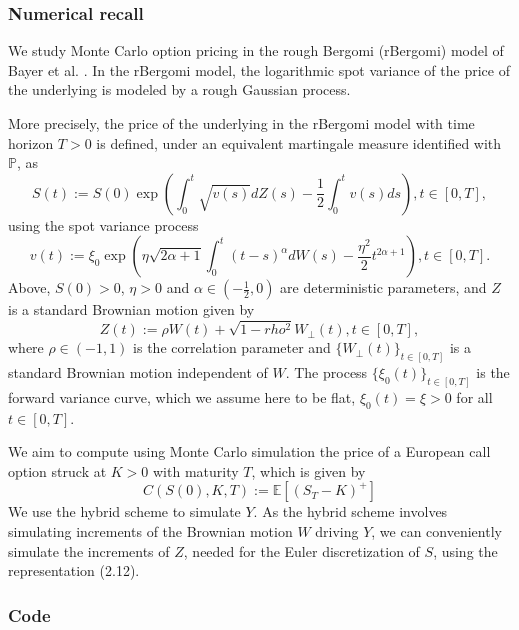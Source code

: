 \documentclass[12pt]{article}
\numberwithin{equation}{section}
\begin{document}
      \subsubsection{Numerical recall}
        
      We study Monte Carlo option pricing in the rough Bergomi (rBergomi) model of Bayer et al. \cite{bayer2015pricing}. In the rBergomi model, the logarithmic spot variance of the price of the underlying is modeled by a rough Gaussian process.

      More precisely, the price of the underlying in the rBergomi model with time horizon $T > 0$ is defined, under an equivalent martingale measure identified with $\mathbb{P}$, as
      \begin{equation}
        S(t) := S(0) \exp\left(\int_0^t\sqrt{v(s)}dZ(s)-\frac{1}{2}\int_0^tv(s)ds\right), t\in[0,T],
      \end{equation}
      using the spot variance process
      \begin{equation}
        v(t) := \xi_0\exp\left(\eta\sqrt{2\alpha+1}\int_0^t(t-s)^\alpha dW(s) - \frac{\eta^2}{2}t^{2\alpha+1}\right), t\in[0,T].
      \end{equation}
      Above, $S(0) > 0$, $\eta > 0$ and $\alpha\in(-\frac{1}{2},0)$ are deterministic parameters, and $Z$ is a standard Brownian motion given by
      \begin{equation}
        Z(t):=\rho W(t)+ \sqrt{1-rho^2} W_\bot(t), t\in[0,T],
      \end{equation}
        where $\rho \in (-1,1)$ is the correlation parameter and $\{W_\bot(t)\}_{t\in[0,T]}$ is a standard Brownian motion independent of $W$. The process $\{\xi_0(t)\}_{t\in[0,T]}$ is the forward variance curve, which we assume here to be flat, $\xi_0(t) = \xi > 0$ for all $t \in [0,T]$.
      
      We aim to compute using Monte Carlo simulation the price of a European call option struck at $K > 0$ with maturity $T$, which is given by
      \begin{equation}
        C(S(0), K, T) := \mathbb{E} [(S_T - K)^+]
      \end{equation}
      We use the hybrid scheme to simulate $Y$. As the hybrid scheme involves simulating increments of the Brownian motion $W$ driving $Y$, we can conveniently simulate the increments of $Z$, needed for the Euler discretization of $S$, using the representation (2.12).
      
      \subsubsection{Code}
      
\end{document}
